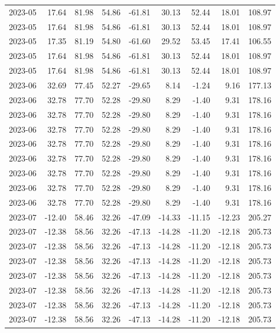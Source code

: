 \begin{table}[ht]
\begin{tabular}{lrrrrrrrr}
  2023-05 & 17.64 & 81.98 & 54.86 & -61.81 & 30.13 & 52.44 & 18.01 & 108.97 \\ 
  2023-05 & 17.64 & 81.98 & 54.86 & -61.81 & 30.13 & 52.44 & 18.01 & 108.97 \\ 
  2023-05 & 17.35 & 81.19 & 54.80 & -61.60 & 29.52 & 53.45 & 17.41 & 106.55 \\ 
  2023-05 & 17.64 & 81.98 & 54.86 & -61.81 & 30.13 & 52.44 & 18.01 & 108.97 \\ 
  2023-05 & 17.64 & 81.98 & 54.86 & -61.81 & 30.13 & 52.44 & 18.01 & 108.97 \\ 
  2023-06 & 32.69 & 77.45 & 52.27 & -29.65 & 8.14 & -1.24 & 9.16 & 177.13 \\ 
  2023-06 & 32.78 & 77.70 & 52.28 & -29.80 & 8.29 & -1.40 & 9.31 & 178.16 \\ 
  2023-06 & 32.78 & 77.70 & 52.28 & -29.80 & 8.29 & -1.40 & 9.31 & 178.16 \\ 
  2023-06 & 32.78 & 77.70 & 52.28 & -29.80 & 8.29 & -1.40 & 9.31 & 178.16 \\ 
  2023-06 & 32.78 & 77.70 & 52.28 & -29.80 & 8.29 & -1.40 & 9.31 & 178.16 \\ 
  2023-06 & 32.78 & 77.70 & 52.28 & -29.80 & 8.29 & -1.40 & 9.31 & 178.16 \\ 
  2023-06 & 32.78 & 77.70 & 52.28 & -29.80 & 8.29 & -1.40 & 9.31 & 178.16 \\ 
  2023-06 & 32.78 & 77.70 & 52.28 & -29.80 & 8.29 & -1.40 & 9.31 & 178.16 \\ 
  2023-06 & 32.78 & 77.70 & 52.28 & -29.80 & 8.29 & -1.40 & 9.31 & 178.16 \\ 
  2023-07 & -12.40 & 58.46 & 32.26 & -47.09 & -14.33 & -11.15 & -12.23 & 205.27 \\ 
  2023-07 & -12.38 & 58.56 & 32.26 & -47.13 & -14.28 & -11.20 & -12.18 & 205.73 \\ 
  2023-07 & -12.38 & 58.56 & 32.26 & -47.13 & -14.28 & -11.20 & -12.18 & 205.73 \\ 
  2023-07 & -12.38 & 58.56 & 32.26 & -47.13 & -14.28 & -11.20 & -12.18 & 205.73 \\ 
  2023-07 & -12.38 & 58.56 & 32.26 & -47.13 & -14.28 & -11.20 & -12.18 & 205.73 \\ 
  2023-07 & -12.38 & 58.56 & 32.26 & -47.13 & -14.28 & -11.20 & -12.18 & 205.73 \\ 
  2023-07 & -12.38 & 58.56 & 32.26 & -47.13 & -14.28 & -11.20 & -12.18 & 205.73 \\ 
  2023-07 & -12.38 & 58.56 & 32.26 & -47.13 & -14.28 & -11.20 & -12.18 & 205.73 \\ 

\end{tabular}
\end{table}
